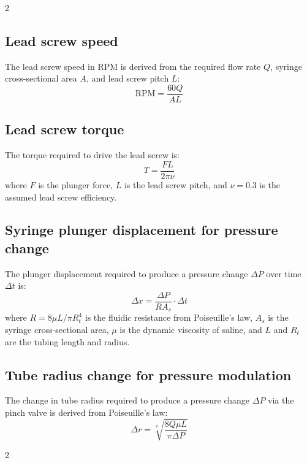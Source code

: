 \documentclass[10pt, a4paper]{article}
\begin{document}
\begin{multicols}{2}
    \subsection{Lead screw speed}

    The lead screw speed in RPM is derived from the required flow rate $Q$, syringe cross-sectional area $A$, and lead screw pitch $L$:
    \begin{equation}
        \text{RPM} = \frac{60Q}{AL}
    \end{equation}

    \subsection{Lead screw torque}

    The torque required to drive the lead screw is:
    \begin{equation}
        T = \frac{FL}{2\pi\nu}
    \end{equation}
    where $F$ is the plunger force, $L$ is the lead screw pitch, and $\nu = 0.3$ is the assumed lead screw efficiency.

    \subsection{Syringe plunger displacement for pressure change}

    The plunger displacement required to produce a pressure change $\Delta P$ over time $\Delta t$ is:
    \begin{equation}
        \Delta x = \frac{\Delta P}{RA_s} \cdot \Delta t
    \end{equation}
    where $R = 8\mu L / \pi R_t^4$ is the fluidic resistance from Poiseuille's law, $A_s$ is the syringe cross-sectional area, $\mu$ is the dynamic viscosity of saline, and $L$ and $R_t$ are the tubing length and radius.

    \subsection{Tube radius change for pressure modulation}

    The change in tube radius required to produce a pressure change $\Delta P$ via the pinch valve is derived from Poiseuille's law:
    \begin{equation}
        \Delta r = \sqrt[4]{\frac{8Q\mu L}{\pi \Delta P}}
    \end{equation}
\end{multicols}

\begingroup
\renewcommand{\bibfont}{\footnotesize}
\printbibheading
\begin{multicols}{2}
    \printbibliography[heading=none]
\end{multicols}
\endgroup
\end{document}
